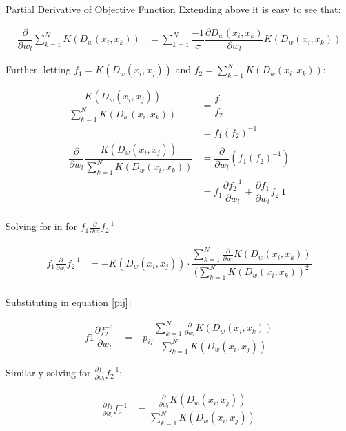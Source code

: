 \documentclass[12pt, a4paper]{article}
\begin{document}
\begin{section}{Partial Derivative of Objective Function}
    Extending above it is easy to see that:

    \begin{align*}
        \dfrac{\partial}{\partial w_l}
        \sum \limits_{k = 1}^N K(D_w(x_i, x_k))
        &= \sum \limits_{k=1}^N
           \dfrac{-1}{\sigma} \dfrac{\partial D_w(x_i, x_k)}{\partial w_l}
           K(D_w(x_i, x_k))
    \end{align*}

    Further, letting $f_1 = K\left (D_w(x_i, x_j) \right )$ and
    $f_2 = \sum \limits_{k = 1}^N K(D_w(x_i, x_k))$:

    \begin{align*}
        \dfrac{K(D_w(x_i, x_j))}
                        {\sum \limits_{k = 1}^N K(D_w(x_i, x_k))}
        &=
            \dfrac{f_1}{f_2} \\
        &=
            f_1(f_2)^{-1} \\
        \dfrac{\partial}{\partial w_l}
        \dfrac{K(D_w(x_i, x_j))}
                        {\sum \limits_{k = 1}^N K(D_w(x_i, x_k))}
        &=
            \dfrac{\partial}{\partial w_l} \left ( f_1(f_2)^{-1} \right ) \\
        &= f_1 \dfrac{\partial f_2^{-1}}{\partial w_l} + 
           \dfrac{\partial f_1}{\partial w_l} f_2^-1 \\
    \end{align*}

    Solving for  in for $f_1 \frac{\partial}{\partial w_l} f_2^{-1}$

    \begin{align*}
        f_1 \frac{\partial}{\partial w_l} f_2^{-1}
            &= - K(D_w(x_i, x_j)) \cdot
               \dfrac{\sum \limits_{k=1}^N \frac{\partial}{\partial w_l} K(D_w(x_i, x_k))}
                     {(\sum \limits_{k=1}^N K(D_w(x_i, x_k))^2}\\
    \end{align*}

    Substituting in equation $\ref{pij}$:

    \begin{align*}
        f1 \dfrac{\partial f_2^{-1}}{\partial w_l}
        &= - p_{ij} \dfrac{\sum \limits_{k=1}^N \frac{\partial}{\partial w_l} K(D_w(x_i, x_k))}
                        {\sum \limits_{k=1}^N K(D_w(x_i, x_j))}
    \end{align*}

    Similarly solving for $\frac{\partial f_1}{\partial w_l} f_2^{-1}$:

    \begin{align*}
        \frac{\partial f_1}{\partial w_l} f_2^{-1}
            &= \dfrac{\frac{\partial}{\partial w_l} K(D_w(x_i, x_j))}
                     {\sum \limits_{k=1}^N K(D_w(x_i, x_j))}
    \end{align*}
    

\end{section}
\end{document}

